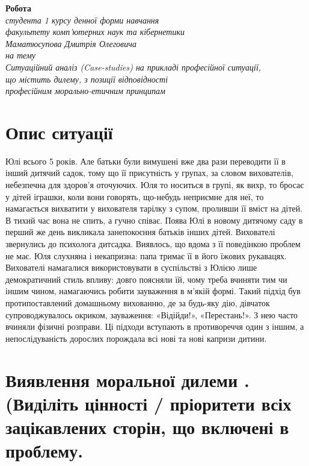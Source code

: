 \documentclass[a4paper,12pt]{article}
\begin{document}

    \begin{center}
        \textbf{Робота \\}
        \textit{
            студента 1 курсу денної форми навчання \\
            факультету комп'ютерних наук та кібернетики \\
            Маматюсупова Дмитрія Олеговича \\
            на тему \\
            Ситуаційний аналіз (Case-studies)  на прикладі  професійної ситуації, \\
            що містить дилему, з позиції відповідності \\
            професійним морально-етичним принципам\\}

    \end{center}

    \section{Опис ситуації}
    Юлі всього 5 років. Але батьки були вимушені вже два рази переводити її в інший дитячий садок,
    тому що її присутність у групах, за словом вихователів, небезпечна для здоров'я оточуючих.
    Юля то носиться в групі, як вихр, то бросає у дітей іграшки, коли вони говорять, що-небудь неприємне для неї,
    то намагається вихватити у вихователя тарілку з супом, проливши її вміст на дітей. В тихий час вона не спить,
    а гучно співає. Поява Юлі в новому дитячому саду в перший же день викликала занепокоєння батьків
    інших дітей. Вихователі звернулись до психолога дитсадка. Виявлось, що вдома з
    її поведінкою проблем не має. Юля слухняна і некапризна: папа тримає
    її в його їжових рукавацях. Вихователі намагалися використовувати в суспільстві з
    Юлією лише демократичний стиль впливу: довго поясняли їй, чому треба вчиняти тим чи іншим чином,
    намагаючись робити зауваження в м'якій формі. Такий підхід був протипоставлений домашньому вихованню,
    де за будь-яку дію, дівчаток супроводжувалось окриком, зауваження: «Відійди!», «Перестань!».
    З нею часто вчиняли фізичні розправи. Ці підходи вступають в противореччя один з іншим,
    а непослідуваність дорослих порождала всі нові та нові капризи дитини.

    \section{Виявлення моральної дилеми . (Виділіть цінності / пріоритети всіх зацікавлених сторін, що включені в проблему.}
\end{document}
